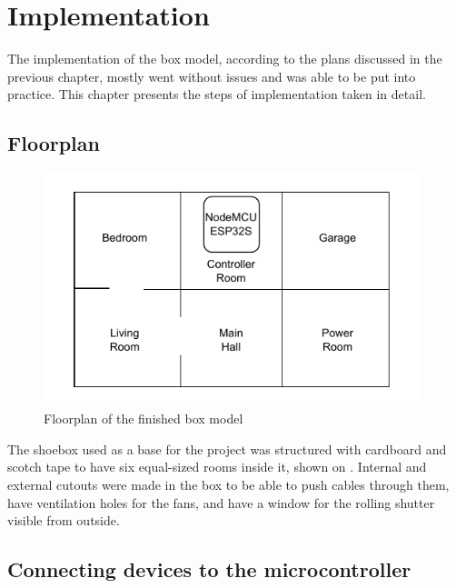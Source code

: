 \chapter{Implementation}

The implementation of the box model, according to the plans discussed in the previous chapter, mostly went without issues and was able to be put into practice. This chapter presents the steps of implementation taken in detail.

\section{Floorplan}

\begin{figure}[!ht]
    \centering
    \includegraphics[page=1,keepaspectratio,width=110mm]{figures/box_floorplan.drawio.pdf}
    \caption{Floorplan of the finished box model}
    \label{fig:BoxFloorplan}
\end{figure}

The shoebox used as a base for the project was structured with cardboard and scotch tape to have six equal-sized rooms inside it, shown on . Internal and external cutouts were made in the box to be able to push cables through them, have ventilation holes for the fans, and have a window for the rolling shutter visible from outside.

\section{Connecting devices to the microcontroller}

